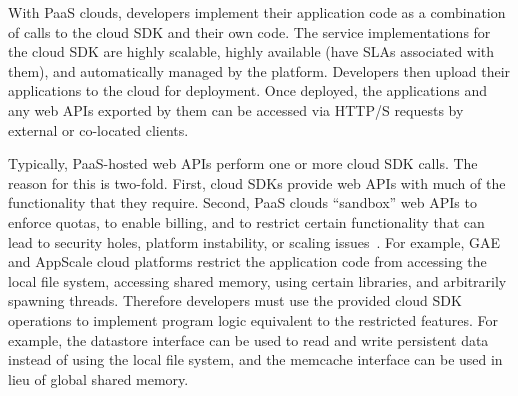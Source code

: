 

With PaaS clouds, developers implement their application code as a combination of calls to the
cloud SDK and their own code.  The service implementations for the 
cloud SDK are highly scalable, highly available (have SLAs associated with them),
and automatically managed by the platform. Developers then
upload their applications to the cloud for deployment.
Once deployed, the applications and any web APIs exported by them can be accessed 
via HTTP/S requests by external or co-located clients.

Typically, PaaS-hosted web APIs perform one or more
cloud SDK calls.  The reason for this is two-fold.  First, 
cloud SDKs provide web APIs with much of the functionality that they require.
Second, PaaS clouds ``sandbox'' web APIs to enforce quotas, to enable billing,
and to restrict certain functionality
that can lead to security holes, platform instability, or scaling issues~\cite{gae-sandbox}.
For example, GAE and AppScale cloud platforms restrict the application code
from accessing the local file system, accessing shared memory, using certain libraries,
and arbitrarily spawning threads. Therefore developers must use the provided cloud 
SDK operations to implement program logic equivalent to the restricted features. For
example, the datastore interface can be used to read and write persistent data instead of 
using the local file system, and the memcache interface can be used in lieu of global
shared memory.

